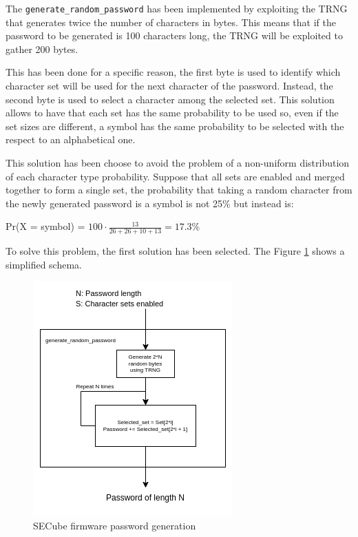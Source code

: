The \texttt{generate\_random\_password} has been implemented by exploiting the TRNG that generates twice the number of characters in bytes. This means that if the password to be generated is 100 characters long, the TRNG will be exploited to gather 200 bytes. 

This has been done for a specific reason, the first byte is used to identify which character set will be used for the next character of the password. Instead, the second byte is used to select a character among the selected set.\newline\newline
This solution allows to have that each set has the same probability to be used so, even if the set sizes are different, a symbol has the same probability to be selected with the respect to an alphabetical one.

This solution has been choose to avoid the problem of a non-uniform distribution of each character type probability. Suppose that all sets are enabled and merged together to form a single set, the probability that taking a random character from the newly generated password is a symbol is not 25\% but instead is:
\begin{center}
	Pr(X = symbol) = $100 \cdot \frac{13}{26+26+10+13} = 17.3 \%$
\end{center}

To solve this problem, the first solution has been selected. The Figure \ref{fig:pass_gen} shows a simplified schema.

\begin{figure}[H]
	\centering
	\includegraphics[width=0.5\linewidth]{images/firmware/pass_gen.png}
	\caption{SECube firmware password generation}
	\label{fig:pass_gen}
\end{figure}



